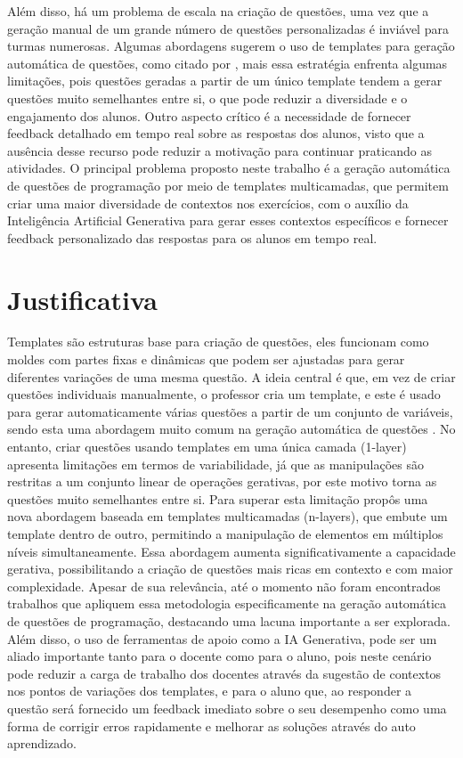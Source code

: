 Além disso, há um problema de escala na criação de questões, uma vez que a geração manual de um grande número de questões personalizadas é inviável para turmas numerosas. Algumas abordagens sugerem o uso de templates para geração automática de questões, como citado por \parencite{zavala2018},  mais essa estratégia enfrenta algumas limitações, pois questões geradas a partir de um único template tendem a gerar questões muito semelhantes entre si, o que pode reduzir a diversidade e o engajamento dos alunos. Outro aspecto crítico é a necessidade de fornecer feedback detalhado em tempo real sobre as respostas dos alunos, visto que a ausência desse recurso pode reduzir a motivação para continuar praticando as atividades.  O principal problema proposto neste trabalho é a geração automática de questões de programação por meio de templates multicamadas, que permitem criar uma maior diversidade de contextos nos exercícios, com o auxílio da Inteligência Artificial Generativa para gerar esses contextos específicos e fornecer feedback personalizado das respostas para os alunos em tempo real.



\section{Justificativa}

Templates são estruturas base para criação de questões, eles funcionam como moldes com partes fixas e dinâmicas que podem ser ajustadas para gerar diferentes variações de uma mesma questão. A ideia central é que, em vez de criar questões individuais manualmente, o professor cria um template, e este é usado para gerar automaticamente várias questões a partir de um conjunto de variáveis, sendo esta uma abordagem muito comum na geração automática de questões \parencite{zavala2018}.  No entanto, criar questões usando templates em uma única camada (1-layer) apresenta limitações em termos de variabilidade, já que as manipulações são restritas a um conjunto linear de operações gerativas, por  este motivo torna as questões muito semelhantes entre si. Para superar esta limitação \parencite{lai2013} propôs uma nova abordagem baseada em templates multicamadas (n-layers), que embute um template dentro de outro, permitindo a manipulação de elementos em múltiplos níveis simultaneamente. Essa abordagem aumenta significativamente a capacidade gerativa, possibilitando a criação de questões mais ricas em contexto e com maior complexidade. Apesar de sua relevância, até o momento não foram encontrados trabalhos que apliquem essa metodologia especificamente na geração automática de questões de programação, destacando uma lacuna importante a ser explorada. Além disso, o uso de ferramentas de apoio como a IA Generativa, pode ser um aliado importante tanto para o docente como para o aluno, pois neste cenário pode reduzir a carga de trabalho dos docentes através da sugestão de contextos nos pontos de variações dos templates, e para o aluno que, ao responder a questão será fornecido um feedback  imediato sobre o seu desempenho como uma forma de corrigir erros rapidamente e melhorar as soluções através do auto aprendizado.

